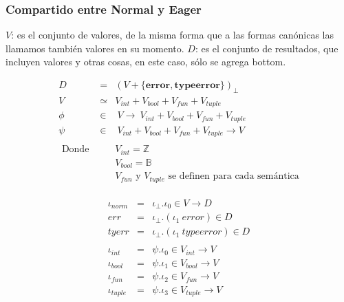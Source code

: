     \subsubsection{Compartido entre Normal y Eager}
      \PN $V$: es el conjunto de valores, de la misma forma que a las formas canónicas las llamamos también valores en su momento.
      \PN $D$: es el conjunto de resultados, que incluyen valores y otras cosas, en este caso, sólo se agrega bottom.
      \begin{multicols}{2}
        \begin{eqnarray*}
          D &=& (V + \{\textbf{error}, \textbf{typeerror}\})_\bot \\
          V &\simeq& V_{int} + V_{bool} + V_{fun} + V_{tuple} \\
          \phi &\in& \ V \rightarrow\ V_{int} + V_{bool} + V_{fun} + V_{tuple} \\
          \psi &\in& \ V_{int} + V_{bool} + V_{fun} + V_{tuple} \rightarrow V \\ \\
          \text{ Donde } && V_{int} = \mathbb{Z} \\
          && V_{bool} = \mathbb{B} \\
          && V_{fun} \text{ y } V_{tuple} \text{ se definen para cada semántica} \\
        \end{eqnarray*}
        \begin{eqnarray*}
          \\ \\ 
          \iota_{norm} &=& \iota_{\bot} . \iota_{0} \in V \rightarrow D \\
          err &=& \iota_{\bot} . (\iota_{1} \ error) \in D \\
          tyerr &=& \iota_{\bot} . (\iota_{1} \ typeerror) \in D \\ \\
          \iota_{int} &=& \psi . \iota_{0} \in V_{int} \rightarrow V \\
          \iota_{bool} &=& \psi . \iota_{1} \in V_{bool} \rightarrow V \\
          \iota_{fun} &=& \psi . \iota_{2} \in V_{fun} \rightarrow V \\
          \iota_{tuple} &=& \psi . \iota_{3} \in V_{tuple} \rightarrow V \\
        \end{eqnarray*}
      \end{multicols}

